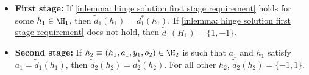 \documentclass[preprint] {imsart}
\begin{document}
{\begin{theorem}
 
 \begin{itemize}
     \item \textbf{First stage:} If \eqref{inlemma: hinge solution first stage requirement} holds for some $h_1\in\H_1$, then $\tilde d_1(h_1)=d_1^*(h_1)$.  If \eqref{inlemma: hinge solution first stage requirement} does not hold, then $\tilde d_1(H_1)=\{1,-1\}$. 
     \item\textbf{Second stage:}
 If $h_2\equiv (h_1,a_1,y_1,o_2)\in\H_2$ is such that $a_1$ and $h_1$ satisfy $a_1=\tilde d_1(h_1)$, then $\tilde d_2(h_2)=d_2^*(h_2)$. For all other $h_2$,  $\tilde d_2(h_2)=\{-1,1\}$.
 \end{itemize}
\end{theorem}

 
}
\end{document}

